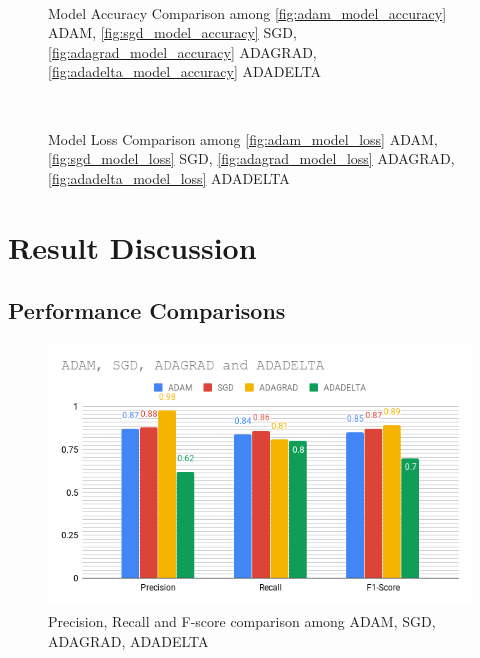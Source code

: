 \documentclass{report}
\begin{document}
\begin{figure}[htbp]
\centering
    \\
  \label{fig:model accuracy}
  \caption{Model Accuracy Comparison among \ref{fig:adam_model_accuracy} ADAM\cite{Adam}, \ref{fig:sgd_model_accuracy} SGD\cite{SGD}, \ref{fig:adagrad_model_accuracy} ADAGRAD\cite{Adagrad}, \ref{fig:adadelta_model_accuracy} ADADELTA\cite{Adadelta}}
\end{figure}

\begin{figure}[htbp]
\centering
    \\
  \label{model loss}
  \caption{Model Loss Comparison among \ref{fig:adam_model_loss} ADAM\cite{Adam}, \ref{fig:sgd_model_loss} SGD\cite{SGD}, \ref{fig:adagrad_model_loss} ADAGRAD\cite{Adagrad}, \ref{fig:adadelta_model_loss} ADADELTA\cite{Adadelta}}
\end{figure}


\chapter{Result Discussion}
\section{Performance Comparisons}

\begin{figure}[htbp]
\centering
\includegraphics[height=7cm]{Pictures/ADAM_SGD_ADAGRAD_and_ADADELTA_graph.png}
\caption{Precision, Recall and F-score comparison among ADAM, SGD, ADAGRAD, ADADELTA}
\label{}
\end{figure}
\end{document}
